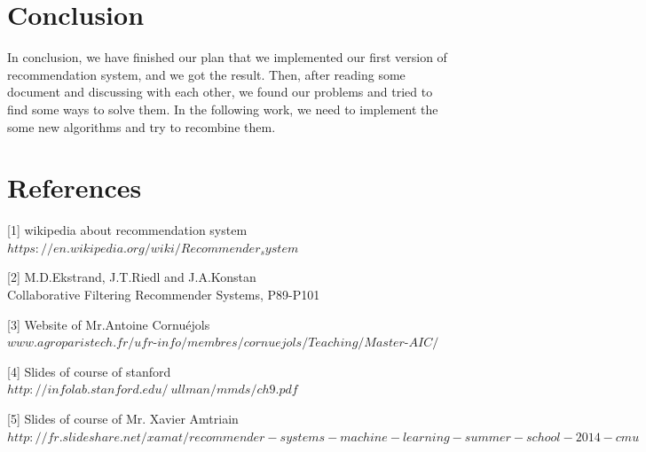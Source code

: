 \documentclass{article}
\begin{document}
\section{Conclusion}
In conclusion, we have finished our plan that we implemented our first version of recommendation system, and we got the result. Then,  after reading some document and discussing with each other, we found our problems and tried to find some ways to solve them. In the following work, we need to implement the  some new algorithms and try to  recombine them. 
\section{References}
[1] wikipedia about recommendation system\\$https://en.wikipedia.org/wiki/Recommender_system$

[2] M.D.Ekstrand, J.T.Riedl and J.A.Konstan\\
Collaborative Filtering Recommender Systems, P89-P101

[3] Website of  Mr.Antoine Cornuéjols \\$www.agroparistech.fr/ufr$-$info/membres/cornuejols/Teaching/Master$-$AIC/$

[4] Slides of course of stanford\\
$http://infolab.stanford.edu/~ullman/mmds/ch9.pdf$

[5] Slides of course of Mr. Xavier Amtriain\\
$http://fr.slideshare.net/xamat/recommender-systems-machine-learning-summer-school-2014-cmu$


\nocite{langley00}



\end{document}
